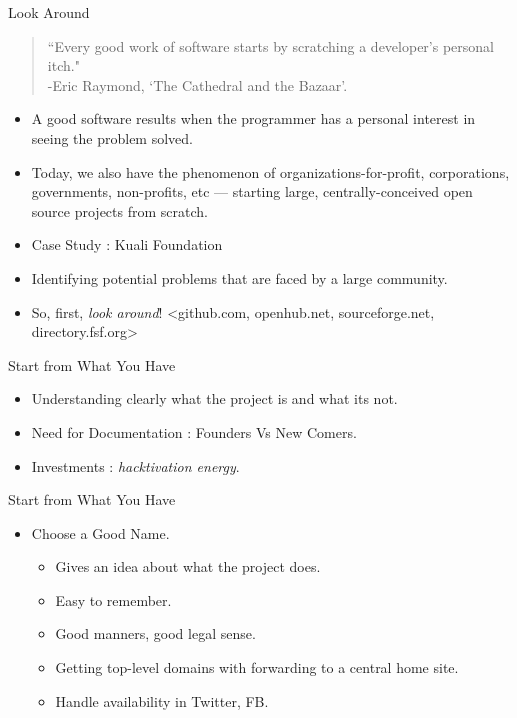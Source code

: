 \documentclass{beamer}
\begin{document}
\begin{frame}{Look Around}
\begin{quote}
\tiny{``Every good work of software starts by scratching a developer's personal itch."\\ -Eric Raymond, `The Cathedral and the Bazaar'.}
\end{quote}
\begin{itemize}
	\item A good software results when the programmer has a personal interest in seeing the problem solved. \pause
	\item Today, we also have the phenomenon of organizations-for-profit, corporations, governments, non-profits, etc — starting large, centrally-conceived open source projects from scratch. \pause
	\item Case Study : Kuali Foundation \pause
	\item Identifying potential problems that are faced by a large community. \pause
	\item So, first, \emph{look around}! <github.com, openhub.net, sourceforge.net, directory.fsf.org>
\end{itemize}
\end{frame}

\begin{frame}{Start from What You Have}
\begin{itemize}
	\item Understanding clearly what the project is and what its not.\pause
	\item Need for Documentation : Founders Vs New Comers.\pause
	\item Investments : \emph{hacktivation energy}.\pause
\end{itemize}
\end{frame}

\begin{frame}{Start from What You Have}
\begin{itemize}
	\item Choose a Good Name. \pause
	\begin{itemize}
		\item Gives an idea about what the project does.\pause
		\item Easy to remember. \pause
		\item Good manners, good legal sense. \pause
		\item Getting top-level domains with forwarding to a central home site. \pause
		\item Handle availability in Twitter, FB.	
	\end{itemize}
\end{itemize}
\end{frame}
\end{document}
